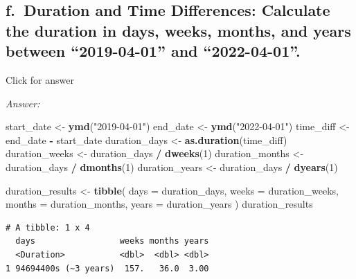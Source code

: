 \documentclass[
]{book}
\newenvironment{Shaded}{\begin{snugshade}}{\end{snugshade}}
\newcommand{\AttributeTok}[1]{\textcolor[rgb]{0.13,0.29,0.53}{#1}}
\newcommand{\DecValTok}[1]{\textcolor[rgb]{0.00,0.00,0.81}{#1}}
\newcommand{\FunctionTok}[1]{\textcolor[rgb]{0.13,0.29,0.53}{\textbf{#1}}}
\newcommand{\NormalTok}[1]{#1}
\newcommand{\OtherTok}[1]{\textcolor[rgb]{0.56,0.35,0.01}{#1}}
\newcommand{\SpecialCharTok}[1]{\textcolor[rgb]{0.81,0.36,0.00}{\textbf{#1}}}
\newcommand{\StringTok}[1]{\textcolor[rgb]{0.31,0.60,0.02}{#1}}
\begin{document}
\hypertarget{f.-duration-and-time-differences-calculate-the-duration-in-days-weeks-months-and-years-between-2019-04-01-and-2022-04-01.}{%
\subsection{f.~Duration and Time Differences: Calculate the duration in days, weeks, months, and years between ``2019-04-01'' and ``2022-04-01''.}\label{f.-duration-and-time-differences-calculate-the-duration-in-days-weeks-months-and-years-between-2019-04-01-and-2022-04-01.}}

Click for answer

\emph{Answer:}

\begin{Shaded}
\begin{Highlighting}[]
\NormalTok{start\_date }\OtherTok{\textless{}{-}} \FunctionTok{ymd}\NormalTok{(}\StringTok{"2019{-}04{-}01"}\NormalTok{)}
\NormalTok{end\_date }\OtherTok{\textless{}{-}} \FunctionTok{ymd}\NormalTok{(}\StringTok{"2022{-}04{-}01"}\NormalTok{)}
\NormalTok{time\_diff }\OtherTok{\textless{}{-}}\NormalTok{ end\_date }\SpecialCharTok{{-}}\NormalTok{ start\_date}
\NormalTok{duration\_days }\OtherTok{\textless{}{-}} \FunctionTok{as.duration}\NormalTok{(time\_diff)}
\NormalTok{duration\_weeks }\OtherTok{\textless{}{-}}\NormalTok{ duration\_days }\SpecialCharTok{/} \FunctionTok{dweeks}\NormalTok{(}\DecValTok{1}\NormalTok{)}
\NormalTok{duration\_months }\OtherTok{\textless{}{-}}\NormalTok{ duration\_days }\SpecialCharTok{/} \FunctionTok{dmonths}\NormalTok{(}\DecValTok{1}\NormalTok{)}
\NormalTok{duration\_years }\OtherTok{\textless{}{-}}\NormalTok{ duration\_days }\SpecialCharTok{/} \FunctionTok{dyears}\NormalTok{(}\DecValTok{1}\NormalTok{)}

\NormalTok{duration\_results }\OtherTok{\textless{}{-}} \FunctionTok{tibble}\NormalTok{(}
  \AttributeTok{days =}\NormalTok{ duration\_days,}
  \AttributeTok{weeks =}\NormalTok{ duration\_weeks,}
  \AttributeTok{months =}\NormalTok{ duration\_months,}
  \AttributeTok{years =}\NormalTok{ duration\_years}
\NormalTok{)}
\NormalTok{duration\_results}
\end{Highlighting}
\end{Shaded}

\begin{verbatim}
# A tibble: 1 x 4
  days                 weeks months years
  <Duration>           <dbl>  <dbl> <dbl>
1 94694400s (~3 years)  157.   36.0  3.00
\end{verbatim}
\end{document}
